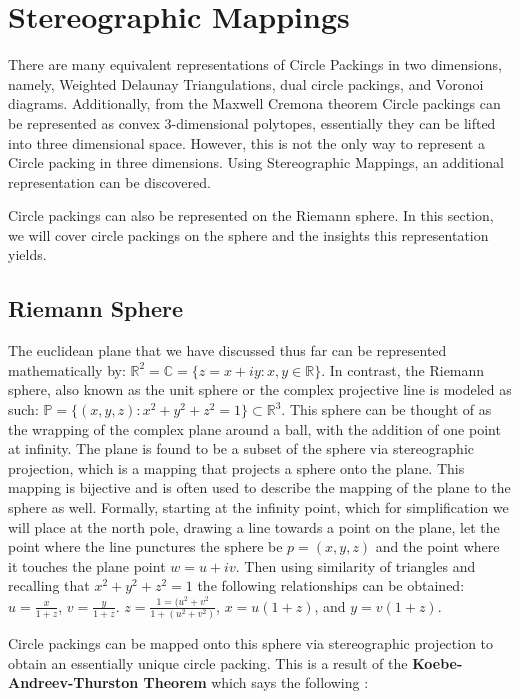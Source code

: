 \documentclass[11pt]{article}
\newcommand{\R}{\mathbb{R}}
\newcommand{\C}{\mathbb{C}}
\begin{document}
\section{Stereographic Mappings}
There are many equivalent representations of Circle Packings in two dimensions, namely, Weighted Delaunay Triangulations, dual circle packings, and Voronoi diagrams. Additionally, from the Maxwell Cremona theorem Circle packings can be represented as convex 3-dimensional polytopes, essentially they can be lifted into three dimensional space. However, this is not the only way to represent a Circle packing in three dimensions. Using Stereographic Mappings, an additional representation can be discovered. 

Circle packings can also be represented on the Riemann sphere. In this section, we will cover circle packings on the sphere and the insights this representation yields.

\subsection{Riemann Sphere}
The euclidean plane that we have discussed thus far can be represented mathematically by: $\R^2 = \C = \{z = x + iy : x, y \in \R \}$. In contrast, the Riemann sphere, also known as the unit sphere or the complex projective line is modeled as such: $\mathbb{P} = \{(x,y,z):x^2 + y^2 + z^2 = 1\} \subset \R^3$. This sphere can be thought of as the wrapping of the complex plane around a ball, with the addition of one point at infinity. The plane is found to be a subset of the sphere via stereographic projection, which is a mapping that projects a sphere onto the plane. This mapping is bijective and is often used to describe the mapping of the plane to the sphere as well. Formally, starting at the infinity point, which for simplification we will place at the north pole, drawing a line towards a point on the plane, let the point where the line punctures the sphere be $p = (x,y,z)$ and the point where it touches the plane point $w = u + iv$. Then using similarity of triangles and recalling that $x^2 + y^2 + z^2 = 1$ the following relationships can be obtained: $u = \frac{x}{1 + z}$, $v = \frac{y}{1+ z}$. $z = \frac{1 = (u^2 + v^2}{1 + (u^2 + v^2)}$, $x = u(1+z)$, and $y =v(1+z)$.

Circle packings can be mapped onto this sphere via stereographic projection to obtain an essentially unique circle packing. This is a result of the \textbf{Koebe-Andreev-Thurston Theorem} which says the following \cite{stephenson05introduction}:
\end{document}
